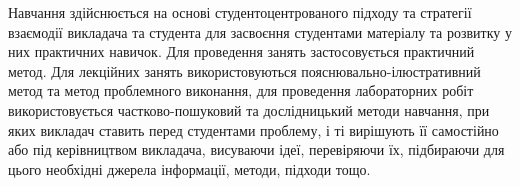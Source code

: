 \documentclass{Syllabus}
\begin{document}
Навчання здійснюється на основі студентоцентрованого підходу та стратегії взаємодії викладача та студента для засвоєння студентами матеріалу та розвитку у них практичних навичок. Для проведення занять застосовується практичний метод. Для лекційних занять використовуються пояснювально-ілюстративний метод та метод проблемного виконання, для проведення лабораторних робіт використовується частково-пошуковий та дослідницький методи навчання, при яких викладач ставить перед студентами проблему, і ті вирішують її самостійно або під керівництвом викладача, висуваючи ідеї, перевіряючи їх, підбираючи для цього необхідні джерела інформації, методи, підходи тощо.

\vspace*{3ex}
\end{document}
